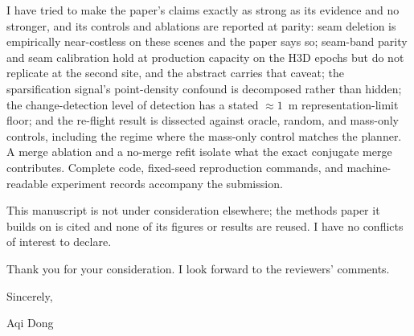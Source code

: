 \documentclass[11pt]{article}
\begin{document}
I have tried to make the paper's claims exactly as strong as its evidence and
no stronger, and its controls and ablations are reported at parity: seam
deletion is empirically near-costless on these scenes and the paper says so;
seam-band parity and seam calibration hold at production capacity on the H3D
epochs but do not replicate at the second site, and the abstract carries that
caveat; the sparsification signal's point-density confound is decomposed
rather than hidden; the change-detection level of detection has a stated
${\approx}1$~m representation-limit floor; and the re-flight result is
dissected against oracle, random, and mass-only controls, including the
regime where the mass-only control matches the planner. A merge ablation and
a no-merge refit isolate what the exact conjugate merge contributes. Complete
code, fixed-seed reproduction commands, and machine-readable experiment
records accompany the submission.

This manuscript is not under consideration elsewhere; the methods paper it
builds on is cited and none of its figures or results are reused. I have no
conflicts of interest to declare.

Thank you for your consideration. I look forward to the reviewers' comments.

\vspace{1.2\baselineskip}
Sincerely,

\vspace{1.6\baselineskip}
Aqi Dong
\end{document}
